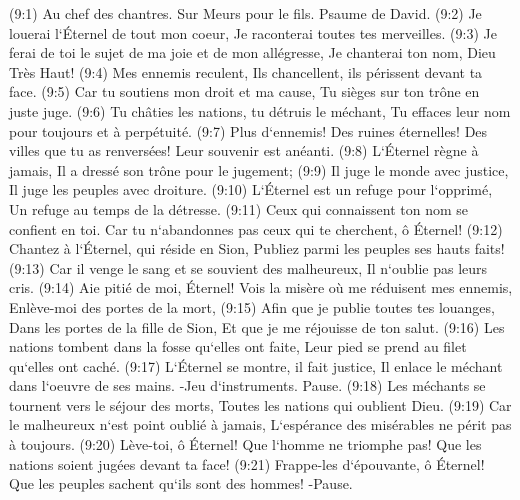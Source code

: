 \verse (9:1) Au chef des chantres. Sur Meurs pour le fils. Psaume de David. (9:2) Je louerai l`Éternel de tout mon coeur, Je raconterai toutes tes merveilles. 
\verse (9:3) Je ferai de toi le sujet de ma joie et de mon allégresse, Je chanterai ton nom, Dieu Très Haut! 
\verse (9:4) Mes ennemis reculent, Ils chancellent, ils périssent devant ta face. 
\verse (9:5) Car tu soutiens mon droit et ma cause, Tu sièges sur ton trône en juste juge. 
\verse (9:6) Tu châties les nations, tu détruis le méchant, Tu effaces leur nom pour toujours et à perpétuité. 
\verse (9:7) Plus d`ennemis! Des ruines éternelles! Des villes que tu as renversées! Leur souvenir est anéanti. 
\verse (9:8) L`Éternel règne à jamais, Il a dressé son trône pour le jugement; 
\verse (9:9) Il juge le monde avec justice, Il juge les peuples avec droiture. 
\verse (9:10) L`Éternel est un refuge pour l`opprimé, Un refuge au temps de la détresse. 
\verse (9:11) Ceux qui connaissent ton nom se confient en toi. Car tu n`abandonnes pas ceux qui te cherchent, ô Éternel! 
\verse (9:12) Chantez à l`Éternel, qui réside en Sion, Publiez parmi les peuples ses hauts faits! 
\verse (9:13) Car il venge le sang et se souvient des malheureux, Il n`oublie pas leurs cris. 
\verse (9:14) Aie pitié de moi, Éternel! Vois la misère où me réduisent mes ennemis, Enlève-moi des portes de la mort, 
\verse (9:15) Afin que je publie toutes tes louanges, Dans les portes de la fille de Sion, Et que je me réjouisse de ton salut. 
\verse (9:16) Les nations tombent dans la fosse qu`elles ont faite, Leur pied se prend au filet qu`elles ont caché. 
\verse (9:17) L`Éternel se montre, il fait justice, Il enlace le méchant dans l`oeuvre de ses mains. -Jeu d`instruments. Pause. 
\verse (9:18) Les méchants se tournent vers le séjour des morts, Toutes les nations qui oublient Dieu. 
\verse (9:19) Car le malheureux n`est point oublié à jamais, L`espérance des misérables ne périt pas à toujours. 
\verse (9:20) Lève-toi, ô Éternel! Que l`homme ne triomphe pas! Que les nations soient jugées devant ta face! 
\verse (9:21) Frappe-les d`épouvante, ô Éternel! Que les peuples sachent qu`ils sont des hommes! -Pause. 

\chapter{}

